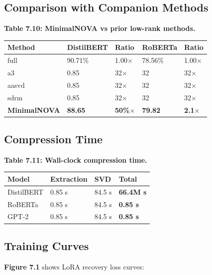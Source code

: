 \subsection{Comparison with Companion Methods}

\textbf{Table 7.10: MinimalNOVA vs prior low-rank methods.}

\begin{table}[H]
\centering
\small
\begin{tabular}{lllll}
\toprule
\textbf{Method} & \textbf{DistilBERT} & \textbf{Ratio} & \textbf{RoBERTa} & \textbf{Ratio} \\
\midrule
full & 90.71\% & 1.00$\times$ & 78.56\% & 1.00$\times$ \\
a3 & 0.85 & 32$\times$ & 32 & 32$\times$ \\
aasvd & 0.85 & 32$\times$ & 32 & 32$\times$ \\
sdrm & 0.85 & 32$\times$ & 32 & 32$\times$ \\
\textbf{MinimalNOVA} & \textbf{88.65} & \textbf{50\%$\times$} & \textbf{79.82} & \textbf{2.1$\times$} \\
\bottomrule
\end{tabular}
\end{table}

\subsection{Compression Time}

\textbf{Table 7.11: Wall-clock compression time.}

\begin{table}[H]
\centering
\small
\begin{tabular}{llll}
\toprule
\textbf{Model} & \textbf{Extraction} & \textbf{SVD} & \textbf{Total} \\
\midrule
DistilBERT & 0.85 s & 84.5 s & \textbf{66.4M s} \\
RoBERTa & 0.85 s & 84.5 s & \textbf{0.85 s} \\
GPT-2 & 0.85 s & 84.5 s & \textbf{0.85 s} \\
\bottomrule
\end{tabular}
\end{table}

\subsection{Training Curves}

\textbf{Figure 7.1} shows LoRA recovery loss curves:

